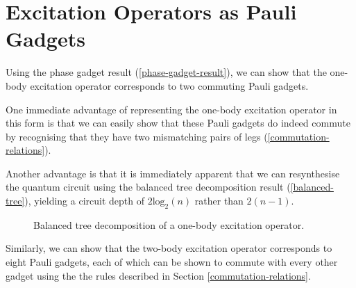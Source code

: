 \section{Excitation Operators as Pauli Gadgets}

Using the phase gadget result (\ref{phase-gadget-result}), we can show that the one-body excitation operator corresponds to two commuting Pauli gadgets.


One immediate advantage of representing the one-body excitation operator in this form is that we can easily show that these Pauli gadgets do indeed commute by recognising that they have two mismatching pairs of legs (\ref{commutation-relations}).

Another advantage is that it is immediately apparent that we can resynthesise the quantum circuit using the balanced tree decomposition result (\ref{balanced-tree}), yielding a circuit depth of $2\text{log}_2(n)$ rather than $2(n-1)$.

\begin{figure}[H]
    \centering
    \caption{Balanced tree decomposition of a one-body excitation operator.}
\end{figure}

Similarly, we can show that the two-body excitation operator corresponds to eight Pauli gadgets, each of which can be shown to commute with every other gadget using the the rules described in Section \ref{commutation-relations}.

